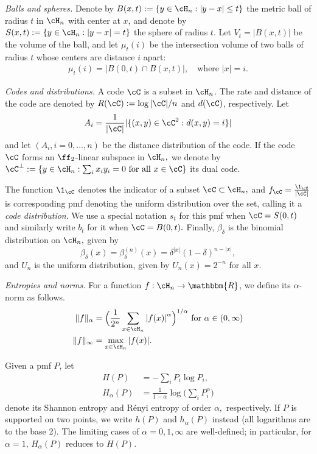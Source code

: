 \documentclass{amsart}
\theoremstyle{remark}
\begin{document}
{\em Balls and spheres.}
Denote by $B(x,t):= \{y\in \cH_n: |y-x| \leq t\}$ the metric ball of radius $t$ in $\cH_n$ with center at $x$, and denote by $S(x,t):=\{y\in \cH_n: |y-x| = t\}$ the sphere of radius $t$.
Let $V_t=|B(x,t)|$ be the volume of the ball, and let $\mu_t(i) $ be the 
intersection volume of two balls of radius $t$ whose centers are distance $i$ apart:
\begin{align}\label{eq:mu_t}
    \mu_t(i)=  |B(0,t)\cap B(x,t)|, \quad \text{where } |x| = i.
\end{align}

{\em Codes and distributions.} A code $\cC$ is a subset in $\cH_n$. The rate and distance of the code are denoted by $R(\cC):=\log|\cC|/n$ and $d(\cC)$, respectively. Let 
\begin{equation}\label{eq:dd}
    A_i=\frac{1}{|\cC|}|\{(x,y)\in\cC^2: d(x,y)=i\}|
\end{equation}    
and let $(A_i,i=0,\dots,n)$ be the distance distribution of the code. If the code $\cC$ forms an $\ff_2$-linear
subspace in $\cH_n,$ we denote by $\cC^\bot:=\{y\in \cH_n: \sum_i x_iy_i=0 \text{ for all }x\in \cC\}$ its dual code. 

The function $\1_{\cC}$ denotes the indicator of a subset $\cC\subset \cH_n,$ and $f_{\cC} =\frac{\1_{\cC}}{|\cC|}$ is corresponding pmf denoting the uniform distribution over the set, calling it a {\em code distribution}. We use a special notation $s_t$ for this pmf when $\cC=S(0,t)$ and similarly write $b_t$ for it when 
$\cC=B(0,t).$ Finally, $\beta_\delta$ is the binomial distribution on $\cH_n,$ given by
  \begin{equation}\label{eq:beta}
    {\beta}_{\delta}(x) = {\beta}_{\delta}^{(n)}(x) = \delta^{|x|}(1-\delta)^{n-|x|},
  \end{equation}
and $U_n$ is the uniform distribution, given by $U_n(x)=2^{-n}$ for all $x.$

\emph{Entropies and norms.}
For a function $f:\cH_n \rightarrow \mathbbm{R}$, we define its $\alpha${-norm} as follows. 
\begin{align*}
    \|f\|_{\alpha}  &= \Big(\frac{1}{2^n}\sum_{x \in \cH_n}{|f(x)|}^{\alpha} \Big)^{1/{\alpha} } \text{ for } \alpha \in {(0,\infty)}\\
    \|f\|_{\infty} &= \max_{x\in \cH_n}{|f(x)|}.
\end{align*}

Given a pmf $P$, let 
 \begin{align}
   H(P)&=-\sum_i P_i\log P_i \label{eq:Shannon},\\
   H_{\alpha} (P)&=\frac1{1-\alpha }\log\Big(\sum_i P_i^{\alpha} \Big) \label{eq:Renyi}
 \end{align}  
denote its Shannon entropy and R{\'e}nyi entropy of order $\alpha,$ respectively.  If $P$ is supported on two points, we write $h(P)$ and $h_{\alpha} (P)$ instead (all logarithms are to the base 2). The limiting cases of $\alpha=0,1,\infty$ are well-defined; in particular, for $\alpha=1$, $H_\alpha(P)$ reduces to $H(P).$
\end{document}
